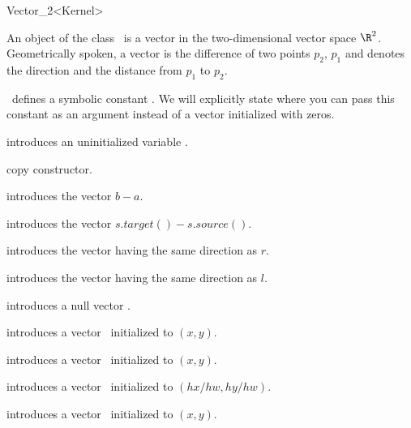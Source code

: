 \begin{ccRefClass} {Vector_2<Kernel>}

\ccDefinition

An object of the class \ccRefName\ is a vector in the two-dimensional 
vector space $\R^2$. Geometrically spoken, a vector is the difference
of two points $p_2$, $p_1$ and denotes the direction and the distance
from   $p_1$ to $p_2$. 

\cgal\ defines a symbolic constant . We 
will explicitly state where you can pass this constant as an argument
instead of a vector initialized with zeros.


\ccCreation
{}


\ccHidden{}
             {introduces an uninitialized variable \ccVar.}

\ccHidden {}
            {copy constructor.}

            {introduces the vector $b-a$.}

            {introduces the vector $s.target()-s.source()$.}

            {introduces the vector having the same direction as $r$.}

            {introduces the vector having the same direction as $l$.}

            {introduces a null vector \ccVar.}

            {introduces a vector \ccVar\ initialized to $(x,y)$.}

            {introduces a vector \ccVar\ initialized to $(x,y)$.}

            {introduces a vector \ccVar\ initialized to $(hx/hw,hy/hw)$.
             \ccPrecond {} }

            {introduces a vector \ccVar\ initialized to $(x,y)$.}


\ccOperations


\end{ccRefClass}
